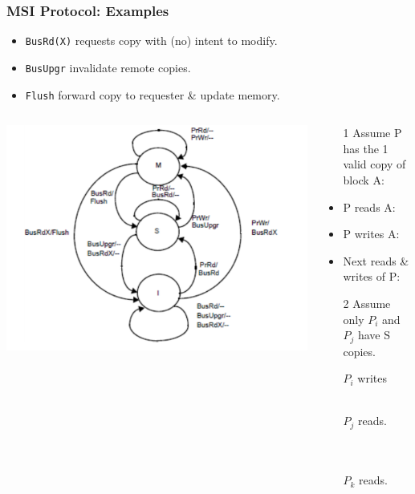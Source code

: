 \documentclass{beamer}
\renewcommand{\emph}[1]{\textcolor{structure}{#1}}
\begin{document}
\begin{frame}[fragile,t]
\frametitle{MSI Protocol: Examples}

\begin{itemize}
    \item \emph{\tt BusRd(X)} requests copy with (no) intent to modify.
    \item \emph{\tt BusUpgr} invalidate remote copies.  
    \item \emph{\tt Flush} forward copy to requester \& update memory.
\end{itemize} 


\begin{columns}\hspace{-7ex}
\includegraphics[width=40ex]{FigsInfCoherence/MSI}
\begin{scriptsize}
\begin{itemize}
    \item[1] \emph{Assume P has the 1 valid copy of block A:}
    \item P reads A: 
    \item P writes A:  
    \item Next reads \& writes of P:\medskip

    \item[2] \emph{Assume only $P_i$ and $P_j$ have S copies.}
    \item[$P_i$ writes] {\tt~~}\\
                        {\tt~~}
    \item[$P_j$ reads.] {\tt~~}\\
                        {\tt~~}\\
                        {\tt~~}
    \item[$P_k$ reads.] {\tt~~}\\
                        {\tt~~}\\ 
                        {\tt~~}\\
\end{itemize}
\end{scriptsize}
\end{columns}

\end{frame}
\end{document}

